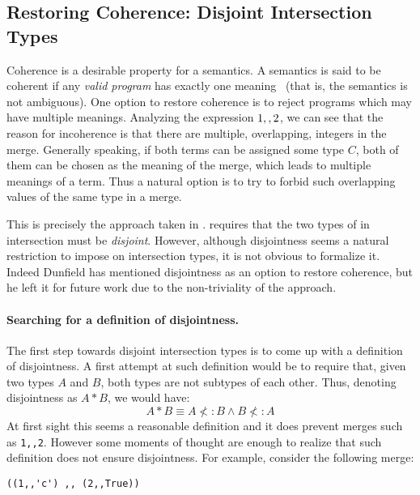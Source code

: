 \subsection{Restoring Coherence: Disjoint Intersection Types}\label{sec:restoring}
Coherence is a desirable property for a semantics. A semantics is said
to be coherent if any \emph{valid program} has exactly one
meaning~\cite{reynolds1991coherence} (that is, the semantics is not ambiguous).
One option to restore coherence is to reject programs which may have
multiple meanings.
Analyzing the expression $1 ,, 2$, we can see that the reason
for incoherence is that there are multiple, overlapping, integers in the
merge. Generally speaking, if both terms can be assigned some type $C$,
both of them can be chosen as the meaning of the merge,
which leads to multiple meanings of a term.
Thus a natural option is to try to forbid such overlapping
values of the same type in a merge.

This is precisely the approach taken in \name. \name requires that the
two types of in intersection must be \emph{disjoint}.  However,
although disjointness seems a natural restriction to impose on
intersection types, it is not obvious to formalize it. Indeed Dunfield
has mentioned disjointness as an option to restore coherence, but he
left it for future work due to the non-triviality of the approach.

\paragraph{Searching for a definition of disjointness.}
The first step towards disjoint intersection types is to come up
with a definition of disjointness. A first attempt at such definition would
be to require that, given two types $A$ and $B$, both types are not
subtypes of each other. Thus, denoting disjointness as $A * B$, we would have:
\[A * B \equiv A \not<: B \wedge B \not<: A\]
At first sight this seems a reasonable definition and it does prevent
merges such as \lstinline{1,,2}. However some moments of thought are enough to realize that
such definition does not ensure disjointness. For example, consider
the following merge:

\begin{lstlisting}
((1,,'c') ,, (2,,True))
\end{lstlisting}

